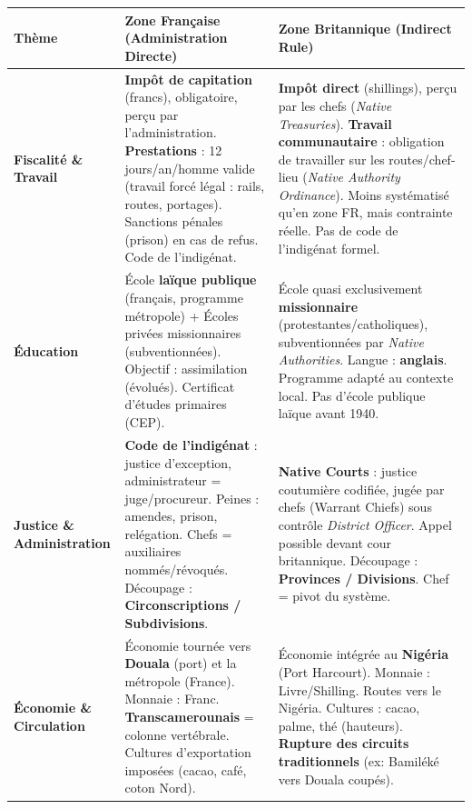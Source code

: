 \documentclass[11pt]{article}
\newcommand{\cle}[1]{{\popxbold\color{popdark}#1}}
\begin{document}
\begin{exoresolu}
\begin{center}
\begin{tabularx}{\linewidth}{|l|X|X|}\hline
\rowcolor{popblueL}
\textbf{Thème} & \textbf{Zone Française (Administration Directe)} & \textbf{Zone Britannique (Indirect Rule)} \\ \hline
\textbf{Fiscalité \& Travail} & \textbf{Impôt de capitation} (francs), obligatoire, perçu par l'administration. \textbf{Prestations} : 12 jours/an/homme valide (travail forcé légal : rails, routes, portages). Sanctions pénales (prison) en cas de refus. Code de l'indigénat. & \textbf{Impôt direct} (shillings), perçu par les chefs (\emph{Native Treasuries}). \textbf{Travail communautaire} : obligation de travailler sur les routes/chef-lieu (\emph{Native Authority Ordinance}). Moins systématisé qu'en zone FR, mais contrainte réelle. Pas de code de l'indigénat formel. \\ \hline
\textbf{Éducation} & École \textbf{laïque publique} (français, programme métropole) + Écoles privées missionnaires (subventionnées). Objectif : \cle{assimilation} (évolués). Certificat d'études primaires (CEP). & École quasi exclusivement \textbf{missionnaire} (protestantes/catholiques), subventionnées par \emph{Native Authorities}. Langue : \textbf{anglais}. Programme adapté au contexte local. Pas d'école publique laïque avant 1940. \\ \hline
\textbf{Justice \& Administration} & \textbf{Code de l'indigénat} : justice d'exception, administrateur = juge/procureur. Peines : amendes, prison, relégation. Chefs = auxiliaires nommés/révoqués. Découpage : \textbf{Circonscriptions / Subdivisions}. & \textbf{Native Courts} : justice coutumière codifiée, jugée par chefs (\cle{Warrant Chiefs}) sous contrôle \emph{District Officer}. Appel possible devant cour britannique. Découpage : \textbf{Provinces / Divisions}. Chef = pivot du système. \\ \hline
\textbf{Économie \& Circulation} & Économie tournée vers \textbf{Douala} (port) et la métropole (France). Monnaie : Franc. \textbf{Transcamerounais} = colonne vertébrale. Cultures d'exportation imposées (cacao, café, coton Nord). & Économie intégrée au \textbf{Nigéria} (Port Harcourt). Monnaie : Livre/Shilling. Routes vers le Nigéria. Cultures : cacao, palme, thé (hauteurs). \textbf{Rupture des circuits traditionnels} (ex: Bamiléké vers Douala coupés). \\ \hline
\end{tabularx}
\end{center}


\end{exoresolu}
\end{document}
